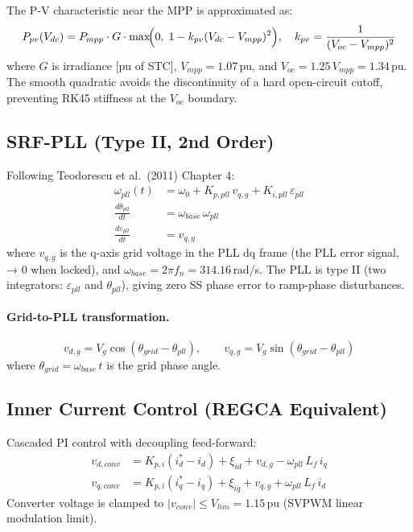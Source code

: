 \documentclass[11pt,a4paper]{article}
\begin{document}
The P-V characteristic near the MPP is approximated as:
\begin{equation}
  P_{pv}(V_{dc}) = P_{mpp}\cdot G \cdot
  \max\!\Bigl(0,\;1 - k_{pv}(V_{dc} - V_{mpp})^2\Bigr),
  \quad k_{pv} = \frac{1}{(V_{oc}-V_{mpp})^2}
  \label{eq:ppv}
\end{equation}
where $G$ is irradiance [pu of STC], $V_{mpp} = 1.07$\,pu,
and $V_{oc} = 1.25\,V_{mpp} = 1.34$\,pu.  The smooth quadratic avoids
the discontinuity of a hard open-circuit cutoff, preventing RK45
stiffness at the $V_{oc}$ boundary.

\subsection{SRF-PLL (Type II, 2nd Order)}

Following Teodorescu et al.\ (2011) Chapter 4:
\begin{align}
  \omega_{pll}(t) &= \omega_0 + K_{p,pll}\,v_{q,g} + K_{i,pll}\,\varepsilon_{pll}
  \label{eq:pll_omega}\\
  \frac{d\theta_{pll}}{dt} &= \omega_{base}\,\omega_{pll}
  \label{eq:pll_theta}\\
  \frac{d\varepsilon_{pll}}{dt} &= v_{q,g}
  \label{eq:pll_int}
\end{align}
where $v_{q,g}$ is the q-axis grid voltage in the PLL dq frame
(the PLL error signal, → 0 when locked), and
$\omega_{base} = 2\pi f_n = 314.16$\,rad/s.
The PLL is type II (two integrators: $\varepsilon_{pll}$ and
$\theta_{pll}$), giving zero SS phase error to ramp-phase disturbances.

\paragraph{Grid-to-PLL transformation.}
\begin{equation}
  v_{d,g} = V_g \cos(\theta_{grid} - \theta_{pll}),\qquad
  v_{q,g} = V_g \sin(\theta_{grid} - \theta_{pll})
  \label{eq:dq_transform}
\end{equation}
where $\theta_{grid} = \omega_{base}\,t$ is the grid phase angle.

\subsection{Inner Current Control (REGCA Equivalent)}

Cascaded PI control with decoupling feed-forward:
\begin{align}
  v_{d,conv} &= K_{p,i}(i_d^\ast - i_d) + \xi_{id}
                + v_{d,g} - \omega_{pll}\,L_f\,i_q
  \label{eq:vd_conv}\\
  v_{q,conv} &= K_{p,i}(i_q^\ast - i_q) + \xi_{iq}
                + v_{q,g} + \omega_{pll}\,L_f\,i_d
  \label{eq:vq_conv}
\end{align}
Converter voltage is clamped to $|v_{conv}| \le V_{lim} = 1.15$\,pu
(SVPWM linear modulation limit).
\end{document}
